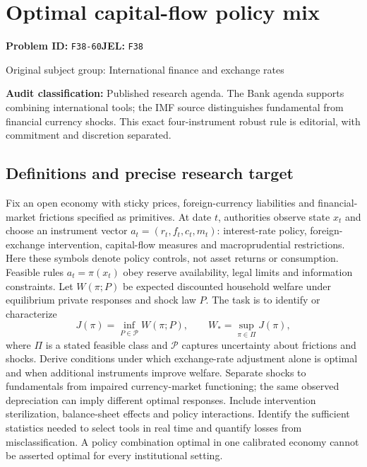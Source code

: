\documentclass[11pt,a4paper]{article}
\begin{document}
\section*{Optimal capital-flow policy mix}
\textbf{Problem ID:} \texttt{F38-60}\quad \textbf{JEL:} \texttt{F38}\par
\label{problem:OP-0337}
{\sffamily\small\color{muted}Original subject group: International finance and exchange rates\par}
\label{definitions:problem:30007619}
\textbf{Audit classification:} Published research agenda. The Bank agenda supports combining international tools; the IMF source distinguishes fundamental from financial currency shocks. This exact four-instrument robust rule is editorial, with commitment and discretion separated.
\subsection*{Definitions and precise research target}
Fix an open economy with sticky prices, foreign-currency liabilities and financial-market frictions specified as primitives. At date \(t\), authorities observe state \(x_t\) and choose an instrument vector \(a_t=(r_t,f_t,c_t,m_t)\): interest-rate policy, foreign-exchange intervention, capital-flow measures and macroprudential restrictions. Here these symbols denote policy controls, not asset returns or consumption. Feasible rules \(a_t=\pi(x_t)\) obey reserve availability, legal limits and information constraints. Let \(W(\pi;P)\) be expected discounted household welfare under equilibrium private responses and shock law \(P\). The task is to identify or characterize
\[J(\pi)=\inf_{P\in\mathcal P}W(\pi;P),\qquad W_*=\sup_{\pi\in\Pi}J(\pi),\]
where \(\Pi\) is a stated feasible class and \(\mathcal P\) captures uncertainty about frictions and shocks. Derive conditions under which exchange-rate adjustment alone is optimal and when additional instruments improve welfare. Separate shocks to fundamentals from impaired currency-market functioning; the same observed depreciation can imply different optimal responses. Include intervention sterilization, balance-sheet effects and policy interactions. Identify the sufficient statistics needed to select tools in real time and quantify losses from misclassification. A policy combination optimal in one calibrated economy cannot be asserted optimal for every institutional setting.
\end{document}
